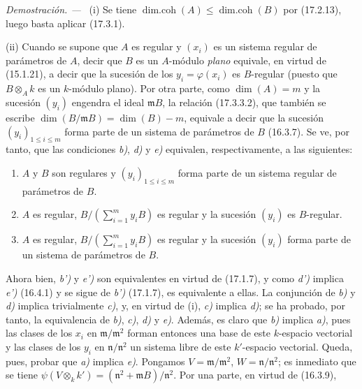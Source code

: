 \documentclass[10pt,oneside]{book}
\newcommand{\oldpage}[2][]{%
  \setcounter{footnote}{0}%
  \marginpar{\scriptsize\textbf{#1}~|~#2}\ignorespaces}
\newenvironment{proof}{%
  \par\medskip\noindent\textit{Demostración. ---\ }}{\par}
\providecommand{\setmin}{-}%
\begin{document}
\begin{proof}
\textnormal{(i)} Se tiene
$\operatorname{dim.coh}(A)\leq\operatorname{dim.coh}(B)$ por (17.2.13), luego
basta aplicar (17.3.1).

\textnormal{(ii)} Cuando se supone que $A$ es regular y $(x_i)$ es un sistema
regular de parámetros de $A$, decir que $B$ es un $A$-módulo \emph{plano}
equivale, en virtud de (15.1.21), a decir que la sucesión de los
$y_i=\varphi(x_i)$ es $B$-regular (puesto que $B\otimes_A k$ es un
$k$-módulo plano). Por otra parte, como $\dim(A)=m$ y la sucesión $(y_i)$
engendra el ideal $\mathfrak{m}B$, la relación (17.3.3.2), que también se
escribe $\dim(B/\mathfrak{m}B)=\dim(B)\setmin m$, equivale a decir que la sucesión
$(y_i)_{1\leq i\leq m}$ forma parte de un sistema de parámetros de $B$
(16.3.7). Se ve, por tanto, que las condiciones \emph{b)}, \emph{d)} y \emph{e)} equivalen,
respectivamente, a las siguientes:
\begin{enumerate}
  \item[\textit{b')}] $A$ y $B$ son regulares y $(y_i)_{1\leq i\leq m}$ forma
  parte de un sistema regular de parámetros de $B$.
  \item[\textit{d')}] $A$ es regular,
  $B/(\sum_{i=1}^m y_iB)$ es regular y la sucesión $(y_i)$ es
  $B$-regular.
  \item[\textit{e')}] $A$ es regular,
  $B/(\sum_{i=1}^m y_iB)$ es regular y la sucesión $(y_i)$ forma parte de un
  sistema de parámetros de $B$.
\end{enumerate}
Ahora bien, \emph{b')} y \emph{e')} son equivalentes en virtud de (17.1.7), y como \emph{d')}
implica \emph{e')} (16.4.1) y se sigue de \emph{b')} (17.1.7), es equivalente a ellas.
La conjunción
\oldpage[0\textsubscript{IV-1}]{49}
de \emph{b)} y \emph{d)} implica trivialmente \emph{c)}, y, en virtud de (i), \emph{c)} implica \emph{d)}; se ha
probado, por tanto, la equivalencia de \emph{b)}, \emph{c)}, \emph{d)} y \emph{e)}. Además, es claro que
\emph{b)} implica \emph{a)}, pues las clases de los $x_i$ en
$\mathfrak{m}/\mathfrak{m}^2$ forman entonces una base de este $k$-espacio
vectorial y las clases de los $y_i$ en $\mathfrak{n}/\mathfrak{n}^2$ un
sistema libre de este $k'$-espacio vectorial. Queda, pues, probar que \emph{a)}
implica \emph{e)}. Pongamos $V=\mathfrak{m}/\mathfrak{m}^2$,
$W=\mathfrak{n}/\mathfrak{n}^2$; es inmediato que se tiene
$\psi(V\otimes_k k')=(\mathfrak{n}^2+\mathfrak{m}B)/\mathfrak{n}^2$. Por una
parte, en virtud de (16.3.9),
\begin{equation}
\label{0.17.3.3.3-es}

\end{equation}
\end{proof}
\end{document}

